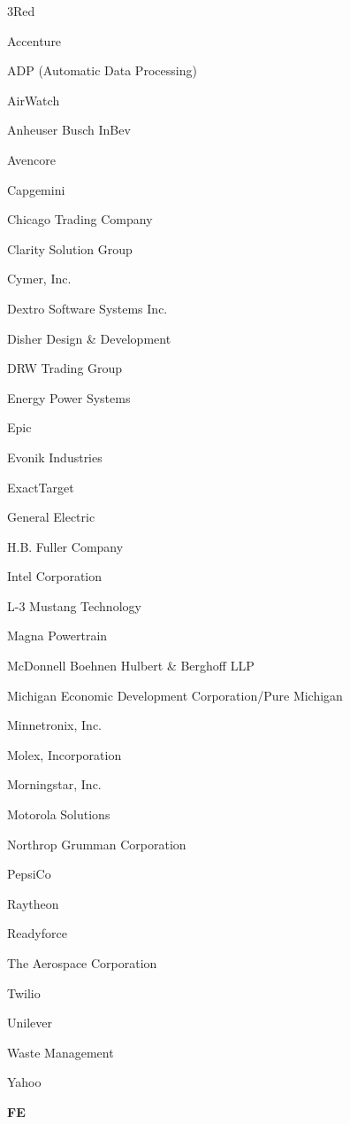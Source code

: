 \documentclass[twoside]{article}
\begin{document}
\begin{center}
\begin{multicols}{5}
\begin{FlushLeft}
\begin{compactitem}
        \item 3Red
\item Accenture
\item ADP (Automatic Data Processing)
\item AirWatch
\item Anheuser Busch InBev
\item Avencore
\item Capgemini
\item Chicago Trading Company
\item Clarity Solution Group
\item Cymer, Inc.
\item Dextro Software Systems Inc.
\item Disher Design \& Development
\item DRW Trading Group
\item Energy Power Systems
\item Epic
\item Evonik Industries
\item ExactTarget
\item General Electric
\item H.B. Fuller Company
\item Intel Corporation
\item L-3 Mustang Technology
\item Magna Powertrain
\item McDonnell Boehnen Hulbert \& Berghoff LLP
\item Michigan Economic Development Corporation/Pure Michigan
\item Minnetronix, Inc.
\item Molex, Incorporation
\item Morningstar, Inc.
\item Motorola Solutions
\item Northrop Grumman Corporation
\item PepsiCo
\item Raytheon
\item Readyforce
\item The Aerospace Corporation
\item Twilio
\item Unilever
\item Waste Management
\item Yahoo
\end{compactitem}
        \end{FlushLeft}
        \vspace{1em}
        {\fontsize{14}{16}\selectfont \bf FE}\\

\end{multicols}
\end{center}
\end{document}
